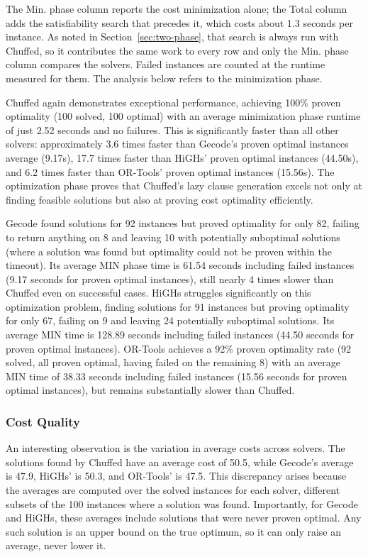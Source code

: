 \documentclass[a4paper,12pt]{article}
\begin{document}
The Min. phase column reports the cost minimization alone; the Total column adds
the satisfiability search that precedes it, which costs about 1.3 seconds per
instance. As noted in Section~\ref{sec:two-phase}, that search is always run with
Chuffed, so it contributes the same work to every row and only the Min. phase
column compares the solvers. Failed instances are counted at the runtime measured for
them. The analysis below refers to the minimization phase.

Chuffed again demonstrates exceptional performance, achieving 100\% proven optimality (100 solved, 100 optimal) with an average minimization phase runtime of just 2.52 seconds and no failures. This is significantly faster than all other solvers: approximately 3.6 times faster than Gecode's proven optimal instances average (9.17s), 17.7 times faster than HiGHs' proven optimal instances (44.50s), and 6.2 times faster than OR-Tools' proven optimal instances (15.56s). The optimization phase proves that Chuffed's lazy clause generation excels not only at finding feasible solutions but also at proving cost optimality efficiently.

Gecode found solutions for 92 instances but proved optimality for only 82, failing to return anything on 8 and leaving 10 with potentially suboptimal solutions (where a solution was found but optimality could not be proven within the timeout). Its average MIN phase time is 61.54 seconds including failed instances (9.17 seconds for proven optimal instances), still nearly 4 times slower than Chuffed even on successful cases. HiGHs struggles significantly on this optimization problem, finding solutions for 91 instances but proving optimality for only 67, failing on 9 and leaving 24 potentially suboptimal solutions. Its average MIN time is 128.89 seconds including failed instances (44.50 seconds for proven optimal instances). OR-Tools achieves a 92\% proven optimality rate (92 solved, all proven optimal, having failed on the remaining 8) with an average MIN time of 38.33 seconds including failed instances (15.56 seconds for proven optimal instances), but remains substantially slower than Chuffed.

\subsubsection{Cost Quality}

An interesting observation is the variation in average costs across solvers. The solutions found by Chuffed have an average cost of 50.5, while Gecode's average is 47.9, HiGHs' is 50.3, and OR-Tools' is 47.5. This discrepancy arises because the averages are computed over the solved instances for each solver, different subsets of the 100 instances where a solution was found. Importantly, for Gecode and HiGHs, these averages include solutions that were never proven optimal. Any such solution is an upper bound on the true optimum, so it can only raise an average, never lower it.
\end{document}
